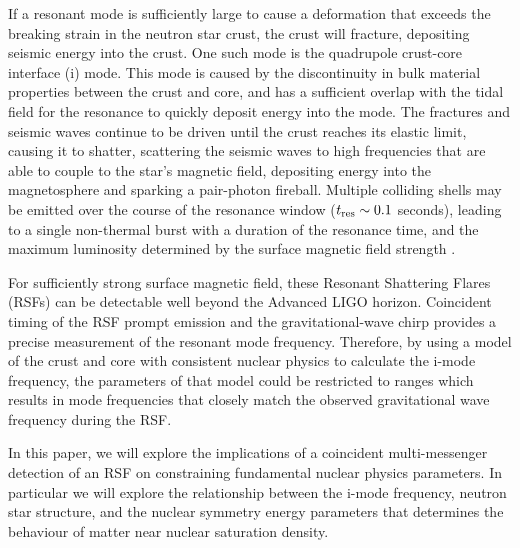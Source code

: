 \documentclass[fleqn,usenatbib]{mnras}
\begin{document}
If a resonant mode is sufficiently large to cause a deformation that exceeds the breaking strain in the neutron star crust, the crust will fracture, depositing seismic energy into the crust. One such mode is the quadrupole crust-core interface (i) mode. This mode is caused by the discontinuity in bulk material properties between the crust and core, and has a sufficient overlap with the tidal field \citep{tsang2012resonant} for the resonance to quickly deposit energy into the mode. The fractures and seismic waves continue to be driven until the crust reaches its elastic limit, causing it to shatter, scattering the seismic waves to high frequencies that are able to couple to the star's magnetic field, depositing energy into the magnetosphere and sparking a pair-photon fireball. Multiple colliding shells may be emitted over the course of the resonance window ($t_{\rm res} \sim 0.1$ seconds), leading to a single non-thermal burst with a duration of the resonance time, and the maximum luminosity determined by the surface magnetic field strength \citep{tsang2013shattering}.

For sufficiently strong surface magnetic field, these Resonant Shattering Flares (RSFs) can be detectable well beyond the Advanced LIGO horizon. Coincident timing of the RSF prompt emission and the gravitational-wave chirp provides a precise measurement of the resonant mode frequency. Therefore, by using a model of the crust and core with consistent nuclear physics to calculate the i-mode frequency, the parameters of that model could be restricted to ranges which results in mode frequencies that closely match the observed gravitational wave frequency during the RSF.  

In this paper, we will explore the implications of a coincident multi-messenger detection of an RSF on constraining fundamental nuclear physics parameters. In particular we will explore the relationship between the i-mode frequency, neutron star structure, and the nuclear symmetry energy parameters that determines the behaviour of matter near nuclear saturation density. 
\end{document}
